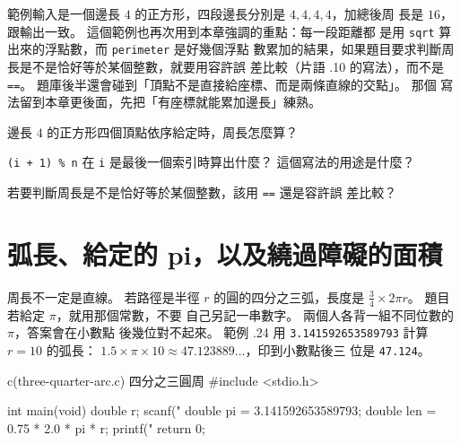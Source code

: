 
範例輸入是一個邊長 $4$ 的正方形，四段邊長分別是 $4, 4, 4, 4$，加總後周
長是 $16$，跟輸出一致。 這個範例也再次用到本章強調的重點：每一段距離都
是用 \texttt{sqrt} 算出來的浮點數，而 \texttt{perimeter} 是好幾個浮點
數累加的結果，如果題目要求判斷周長是不是恰好等於某個整數，就要用容許誤
差比較（片語 \thechapter.10 的寫法），而不是 \texttt{==}。
題庫後半還會碰到「頂點不是直接給座標、而是兩條直線的交點」。 那個
寫法留到本章更後面，先把「有座標就能累加邊長」練熟。

\begin{drills}[label=drills:float-polygon-perimeter]
\item 邊長 $4$ 的正方形四個頂點依序給定時，周長怎麼算？
\item \texttt{(i + 1) \% n} 在 \texttt{i} 是最後一個索引時算出什麼？
這個寫法的用途是什麼？
\item 若要判斷周長是不是恰好等於某個整數，該用 \texttt{==} 還是容許誤
差比較？
\end{drills}

\section{弧長、給定的 pi，以及繞過障礙的面積}
\label{sec:float-arc-area}

周長不一定是直線。 若路徑是半徑 $r$ 的圓的四分之三弧，長度是
$\frac{3}{4} \times 2\pi r$。 題目若給定 $\pi$，就用那個常數，不要
自己另記一串數字。 兩個人各背一組不同位數的 $\pi$，答案會在小數點
後幾位對不起來。 範例 \thechapter.24 用
\texttt{3.141592653589793} 計算 $r=10$ 的弧長：
$1.5 \times \pi \times 10 \approx 47.123889\ldots$，印到小數點後三
位是 \texttt{47.124}。

\begin{example}{c}{(three-quarter-arc.c) 四分之三圓周}
#include <stdio.h>

int main(void) {
    double r;
    scanf("%
    double pi = 3.141592653589793;
    double len = 0.75 * 2.0 * pi * r;
    printf("%
    return 0;
}
\end{example}


